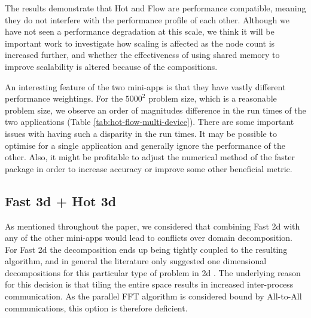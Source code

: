 \documentclass[runningheads,a4paper]{llncs}
\begin{document}
%


The results demonstrate that Hot and Flow are performance compatible, meaning they do not interfere with the performance profile of each other. Although we have not seen a performance degradation at this scale, we think it will be important work to investigate how scaling is affected as the node count is increased further, and whether the effectiveness of using shared memory to improve scalability is altered because of the compositions.

An interesting feature of the two mini-apps is that they have vastly different performance weightings. For the $5000^2$ problem size, which is a reasonable problem size, we observe an order of magnitudes difference in the run times of the two applications (Table \ref{tab:hot-flow-multi-device}). There are some important issues with having such a disparity in the run times. It may be possible to optimise for a single application and generally ignore the performance of the other. Also, it might be profitable to adjust the numerical method of the faster package in order to increase accuracy or improve some other beneficial metric.


\subsection{Fast 3d + Hot 3d}

As mentioned throughout the paper, we considered that combining Fast 2d with any of the other mini-apps would lead to conflicts over domain decomposition. For Fast 2d the decomposition ends up being tightly coupled to the resulting algorithm, and in general the literature only suggested one dimensional decompositions for this particular type of problem in 2d \cite{Pissis2008}. The underlying reason for this decision is that tiling the entire space results in increased inter-process communication. As the parallel FFT algorithm is considered bound by All-to-All communications, this option is therefore deficient.
\end{document}
